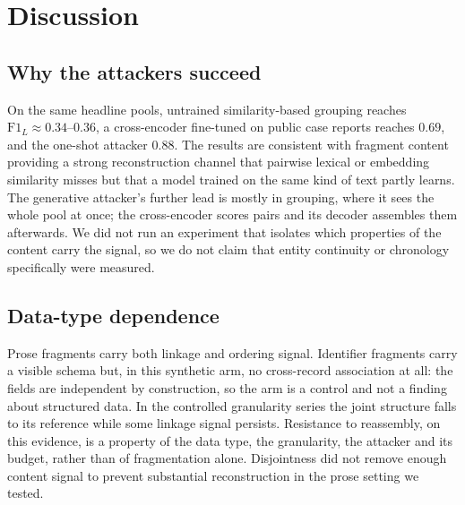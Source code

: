 \documentclass[sigconf,review]{acmart}
\newcommand{\FL}{\ensuremath{\mathrm{F1}_{L}}}
\begin{document}
\section{Discussion}
\label{sec:discussion}

\subsection{Why the attackers succeed}
On the same headline pools, untrained similarity-based grouping reaches
$\FL \approx 0.34$--$0.36$, a cross-encoder fine-tuned on public case reports
reaches $0.69$, and the one-shot attacker $0.88$. The results are consistent
with fragment content providing a strong reconstruction channel that pairwise
lexical or embedding similarity misses but that a model trained on the same
kind of text partly learns. The generative attacker's further lead is mostly in
grouping, where it sees the whole pool at once; the cross-encoder scores pairs
and its decoder assembles them afterwards. We did not run an experiment that
isolates which properties of the content carry the signal, so we do not claim
that entity continuity or chronology specifically were measured.

\subsection{Data-type dependence}
Prose fragments carry both linkage and ordering signal. Identifier fragments
carry a visible schema but, in this synthetic arm, no cross-record association
at all: the fields are independent by construction, so the arm is a control
and not a finding about structured data. In the controlled granularity series
the joint structure falls to
its reference while some linkage signal persists. Resistance to reassembly, on
this evidence, is a property of the data type, the granularity, the attacker
and its budget, rather than of fragmentation alone. Disjointness did not remove
enough content signal to prevent substantial reconstruction in the prose
setting we tested.
\end{document}
